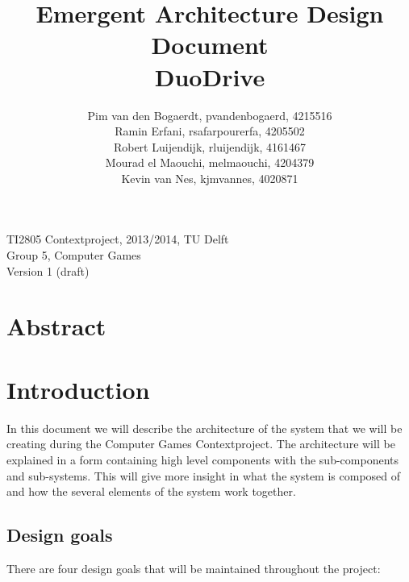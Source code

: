 \documentclass[11pt,twoside,a4paper]{article}
\title{
  Emergent Architecture Design Document\\
  DuoDrive
}
\author{
	Pim van den Bogaerdt, pvandenbogaerd, 4215516\\
	Ramin Erfani, rsafarpourerfa, 4205502\\
	Robert Luijendijk, rluijendijk, 4161467\\
	Mourad el Maouchi, melmaouchi, 4204379\\
	Kevin van Nes, kjmvannes, 4020871
}
\begin{document}
\maketitle
\begin{center}
TI2805 Contextproject, 2013/2014, TU Delft\\
Group 5, Computer Games\\
Version 1 (draft)
\end{center}
\clearpage


\section*{Abstract}



\clearpage
\tableofcontents

\clearpage


\section{Introduction}
In this document we will describe the architecture of the system that we will be creating during the Computer Games Contextproject. The architecture will be explained in a form containing high level components with the sub-components and sub-systems. This will give more insight in what the system is composed of and how the several elements of the system work together. 


\subsection{Design goals}
There are four design goals that will be maintained throughout the project:
\end{document}
